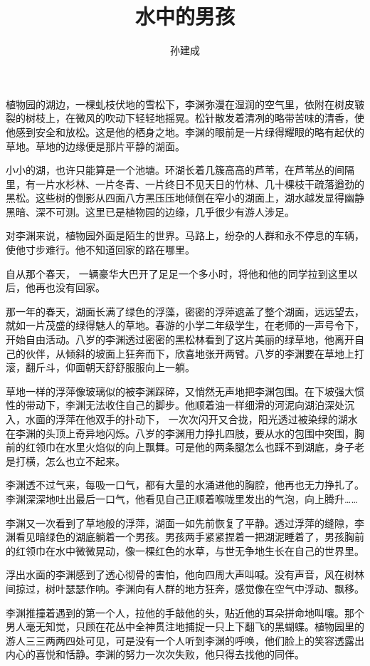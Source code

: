 \documentclass[UTF8]{ctexart}
\title{水中的男孩}
\author{孙建成}
\date{}
\begin{document}
\maketitle

\newpage

植物园的湖边，一棵虬枝伏地的雪松下，李渊弥漫在湿润的空气里，依附在树皮皲裂的树枝上，在微风的吹动下轻轻地摇晃。松针散发着清冽的略带苦味的清香，使他感到安全和放松。这是他的栖身之地。李渊的眼前是一片绿得耀眼的略有起伏的草地。草地的边缘便是那片平静的湖面。

小小的湖，也许只能算是一个池塘。环湖长着几簇高高的芦苇，在芦苇丛的间隔里，有一片水杉林、一片冬青、一片终日不见天日的竹林、几十棵枝干疏落遒劲的黑松。这些树的倒影从四面八方黑压压地倾倒在窄小的湖面上，湖水越发显得幽静黑暗、深不可测。这里已是植物园的边缘，几乎很少有游人涉足。

对李渊来说，植物园外面是陌生的世界。马路上，纷杂的人群和永不停息的车辆，使他寸步难行。他不知道回家的路在哪里。

自从那个春天，
一辆豪华大巴开了足足一个多小时，将他和他的同学拉到这里以后，他再也没有回家。

那一年的春天，湖面长满了绿色的浮藻，密密的浮萍遮盖了整个湖面，远远望去，就如一片茂盛的绿得魅人的草地。春游的小学二年级学生，在老师的一声号令下，开始自由活动。八岁的李渊透过密密的黑松林看到了这片美丽的绿草地，他离开自己的伙伴，从倾斜的坡面上狂奔而下，欣喜地张开两臂。八岁的李渊要在草地上打滚，翻斤斗，仰面朝天舒舒服服向上一躺。

草地一样的浮萍像玻璃似的被李渊踩碎，又悄然无声地把李渊包围。在下坡强大惯性的带动下，李渊无法收住自己的脚步。他顺着油一样细滑的河泥向湖泊深处沉入，水面的浮萍在他双手的扑动下，
一次次闪开又合拢，阳光透过被染绿的湖水在李渊的头顶上奇异地闪烁。八岁的李渊用力挣扎四肢，要从水的包围中突围，胸前的红领巾在水里火焰似的向上飘舞。可是他的两条腿怎么也踩不到湖底，身子老是打横，怎么也立不起来。

李渊透不过气来，每吸一口气，都有大量的水涌进他的胸腔，他再也无力挣扎了。李渊深深地吐出最后一口气，他看见自己正顺着喉咙里发出的气泡，向上腾升\ldots\ldots{}

李渊又一次看到了草地般的浮萍，湖面一如先前恢复了平静。透过浮萍的缝隙，李渊看见暗绿色的湖底躺着一个男孩。男孩两手紧紧捏着一把湖泥睡着了，男孩胸前的红领巾在水中微微晃动，像一棵红色的水草，与世无争地生长在自己的世界里。

浮出水面的李渊感到了透心彻骨的害怕，他向四周大声叫喊。没有声音，风在树林间掠过，树叶瑟瑟作响。李渊向有人群的地方狂奔，感觉像在空气中浮动、飘移。

李渊推撞着遇到的第一个人，拉他的手敲他的头，贴近他的耳朵拼命地叫嚷。那个男人毫无知觉，只顾在花丛中全神贯注地捕捉一只上下翻飞的黑蝴蝶。植物园里的游人三三两两四处可见，可是没有一个人听到李渊的呼唤，他们脸上的笑容透露出内心的喜悦和恬静。李渊的努力一次次失败，他只得去找他的同伴。
\end{document}
